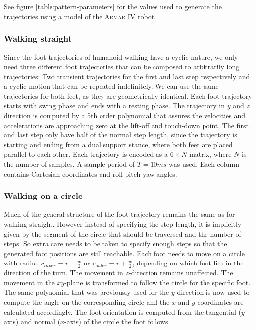 \documentclass[english,ngerman]{KITreprt}
\newcommand{\name}[1]{\textsc{#1}}
\begin{document}
See figure \ref{table:pattern-parameters} for the values used to
generate the trajectories using a model of the \name{Armar IV} robot.

\subsubsection{Walking straight}\label{walking-straight}

Since the foot trajectories of humanoid walking have a cyclic nature, we
only need three different foot trajectories that can be composed to
arbitrarily long trajectories: Two transient trajectories for the first
and last step respectively and a cyclic motion that can be repeated
indefinitely. We can use the same trajectories for both feet, as they
are geometrically identical. Each foot trajectory starts with swing
phase and ends with a resting phase. The trajectory in $y$ and $z$
direction is computed by a 5th order polynomial that assures the
velocities and accelerations are approaching zero at the lift-off and
touch-down point. The first and last step only have half of the normal
step length, since the trajectory is starting and ending from a dual
support stance, where both feet are placed parallel to each other. Each
trajectory is encoded as a $6 \times N$ matrix, where $N$ is the number
of samples. A sample period of $T = 10ms$ was used. Each column contains
Cartesian coordinates and roll-pitch-yaw angles.

\subsubsection{Walking on a circle}\label{walking-on-a-circle}

Much of the general structure of the foot trajectory remains the same as
for walking straight. However instead of specifying the step length, it
is implicitly given by the segment of the circle that should be
traversed and the number of steps. So extra care needs to be taken to
specify enough steps so that the generated foot positions are still
reachable. Each foot needs to move on a circle with radius
$r_{inner} = r - \frac{w}{2}$ or $r_{outer} = r + \frac{w}{2}$,
depending on which foot lies in the direction of the turn. The movement
in $z$-direction remains unaffected. The movement in the $xy$-plane is
transformed to follow the circle for the specific foot. The same
polynomial that was previously used for the $y$-direction is now used to
compute the angle on the corresponding circle and the $x$ and $y$
coordinates are calculated accordingly. The foot orientation is computed
from the tangential ($y$-axis) and normal ($x$-axis) of the circle the
foot follows.
\end{document}
